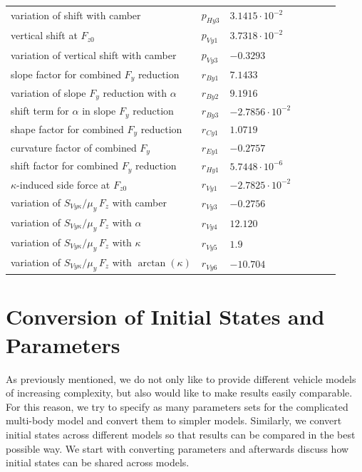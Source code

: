 \documentclass[11pt,a4paper]{article}
\renewcommand{\^}[1]{^{(#1)}}
\begin{document}
\begin{table}[h!tb]
{\begin{center}
\begin{tabular}{lllclll}
	variation of shift with camber & $p_{Hy3}$ & $3.1415\cdot 10^{-2}$ \\
	vertical shift at $F_{z0}$ & $p_{Vy1}$ & $3.7318\cdot 10^{-2}$ \\
	variation of vertical shift with camber & $p_{Vy3}$ & $-0.3293$ \\
	slope factor for combined $F_y$ reduction & $r_{By1}$ & $7.1433$ \\
	variation of slope $F_y$ reduction with $\alpha$ & $r_{By2}$ & $9.1916$ \\
	shift term for $\alpha$ in slope $F_y$ reduction & $r_{By3}$ & $-2.7856\cdot 10^{-2}$ \\
	shape factor for combined $F_y$ reduction & $r_{Cy1}$ & $1.0719$ \\
	curvature factor of combined $F_y$ & $r_{Ey1}$ & $-0.2757$ \\
	shift factor for combined $F_y$ reduction & $r_{Hy1}$ & $5.7448\cdot 10^{-6}$ \\
	$\kappa$-induced side force at $F_{z0}$ & $r_{Vy1}$ & $-2.7825\cdot 10^{-2}$ \\
	variation of $S_{Vy\kappa}/\mu_y \, F_z$ with camber & $r_{Vy3}$ & $-0.2756$ \\
	variation of $S_{Vy\kappa}/\mu_y \, F_z$ with $\alpha$ & $r_{Vy4}$ & $12.120$ \\
	variation of $S_{Vy\kappa}/\mu_y \, F_z$ with $\kappa$ & $r_{Vy5}$ & $1.9$ \\
	variation of $S_{Vy\kappa}/\mu_y \, F_z$ with $\arctan(\kappa)$ & $r_{Vy6}$ & $-10.704$ \\
	\bottomrule 
\end{tabular}
\end{center}}
\end{table}


\section{Conversion of Initial States and Parameters} \label{sec:conversion}

As previously mentioned, we do not only like to provide different vehicle models of increasing complexity, but also would like to make results easily comparable. For this reason, we try to specify as many parameters sets for the complicated multi-body model and convert them to simpler models. Similarly, we convert initial states across different models so that results can be compared in the best possible way. We start with converting parameters and afterwards discuss how initial states can be shared across models.
\end{document}

